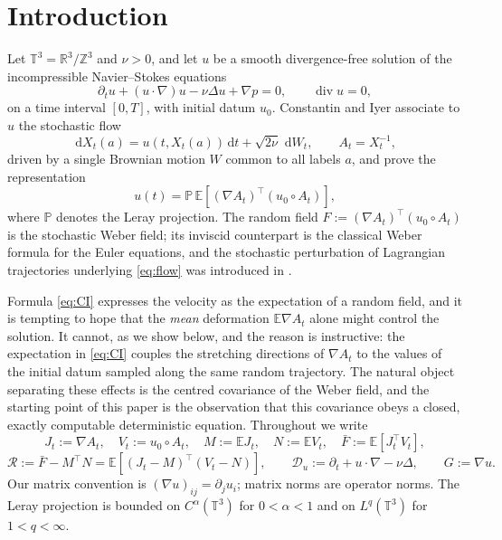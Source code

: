\documentclass[11pt,reqno]{amsart}
\newcommand{\R}{\mathbb{R}}
\newcommand{\T}{\mathbb{T}}
\newcommand{\E}{\mathbb{E}}
\newcommand{\dd}{\,\mathrm{d}}
\newcommand{\Leray}{\mathbb{P}}
\DeclareMathOperator{\diver}{div}
\theoremstyle{definition}
\begin{document}
\section{Introduction}

Let $\T^3=\R^3/\mathbb Z^3$ and $\nu>0$, and let $u$ be a smooth divergence-free solution
of the incompressible Navier--Stokes equations
\begin{equation}\label{eq:NS}
  \partial_t u+(u\cdot\nabla)u-\nu\Delta u+\nabla p=0,\qquad \diver u=0,
\end{equation}
on a time interval $[0,T]$, with initial datum $u_0$. Constantin and Iyer
\cite{ConstantinIyer2008} associate to $u$ the stochastic flow
\begin{equation}\label{eq:flow}
  \dd X_t(a)=u(t,X_t(a))\dd t+\sqrt{2\nu}\,\dd W_t,\qquad A_t=X_t^{-1},
\end{equation}
driven by a single Brownian motion $W$ common to all labels $a$, and prove the
representation
\begin{equation}\label{eq:CI}
  u(t)=\Leray\,\E\!\left[(\nabla A_t)^{\top}(u_0\circ A_t)\right],
\end{equation}
where $\Leray$ denotes the Leray projection. The random field
$F:=(\nabla A_t)^\top(u_0\circ A_t)$ is the stochastic Weber field; its inviscid
counterpart is the classical Weber formula for the Euler equations, and the stochastic
perturbation of Lagrangian trajectories underlying \eqref{eq:flow} was introduced in
\cite{Iyer2006CMP}.

Formula \eqref{eq:CI} expresses the velocity as the expectation of a random field, and it
is tempting to hope that the \emph{mean} deformation $\E\nabla A_t$ alone might control the
solution. It cannot, as we show below, and the reason is instructive: the expectation in
\eqref{eq:CI} couples the stretching directions of $\nabla A_t$ to the values of the
initial datum sampled along the same random trajectory. The natural object separating
these effects is the centred covariance of the Weber field, and the starting point of this
paper is the observation that this covariance obeys a closed, exactly computable
deterministic equation. Throughout we write
\[
  J_t:=\nabla A_t,\quad V_t:=u_0\circ A_t,\quad
  M:=\E J_t,\quad N:=\E V_t,\quad \bar F:=\E[J_t^\top V_t],
\]
\[
  \mathcal R:=\bar F-M^\top N=\E\!\left[(J_t-M)^\top(V_t-N)\right],\qquad
  \mathcal D_u:=\partial_t+u\cdot\nabla-\nu\Delta,\qquad G:=\nabla u.
\]
Our matrix convention is $(\nabla u)_{ij}=\partial_j u_i$; matrix norms are operator norms.
The Leray projection is bounded on $C^\alpha(\T^3)$ for $0<\alpha<1$ and on $L^q(\T^3)$ for
$1<q<\infty$.
\end{document}
